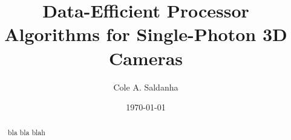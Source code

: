 \documentclass[letterpaper,12pt]{article}
\title{Data-Efficient Processor Algorithms for Single-Photon 3D Cameras}
\author{Cole A. Saldanha}
\date{\today}
\begin{document}
\maketitle

\begin{abstract}
bla bla blah
\end{abstract}

\printbibliography
\end{document}
